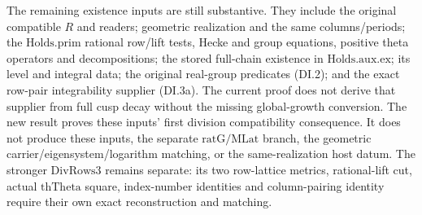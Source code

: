The remaining existence inputs are still substantive. They include
the original compatible \(R\) and readers; geometric realization and
the same columns/periods; the \(\mathrm{Holds}.\mathrm{prim}\)
rational row/lift tests, Hecke and group equations, positive theta
operators and decompositions; the stored full-chain existence in
\(\mathrm{Holds}.\mathrm{aux}.\mathrm{ex}\); its level and integral
data; the original real-group predicates (DI.2); and the exact
row-pair integrability supplier (DI.3a). The current proof does not
derive that supplier from full cusp decay without the missing
global-growth conversion. The new result proves these inputs'
first division compatibility consequence. It does not produce these
inputs, the separate \(\mathrm{ratG/MLat}\) branch, the geometric
carrier/eigensystem/logarithm matching, or the same-realization host
datum. The stronger \(\mathrm{DivRows3}\) remains separate: its
two row-lattice metrics, rational-lift cut, actual \(\mathrm{thTheta}\)
square, index-number identities and column-pairing identity require
their own exact reconstruction and matching.
